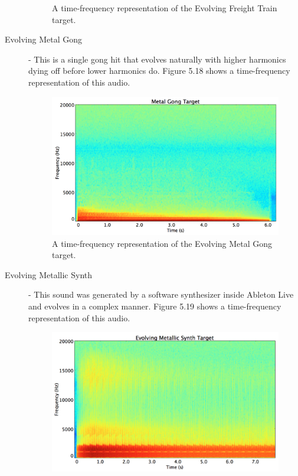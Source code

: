 \documentclass[a4paper,12pt]{report} 	%
\numberwithin{figure}{chapter}
\numberwithin{table}{chapter}
\numberwithin{equation}{chapter}
\begin{document}
\begin{flushleft}
\begin{description}
\begin{figure}[h!]
\begin{center}
\caption[Evolving Freight Train Time-Frequency Representation]{A time-frequency representation of the Evolving Freight Train target.}
\end{center}
\end{figure}
\item[Evolving Metal Gong] - This is a single gong hit that evolves naturally with higher harmonics dying off before lower harmonics do. Figure 5.18 shows a time-frequency representation of this audio.
\begin{figure}[h!]
\begin{center}
\includegraphics[scale=0.35,width=\linewidth]{MetalGongTargetSTFT}
\caption[Evolving Metal Gong Time-Frequency Representation]{A time-frequency representation of the Evolving Metal Gong target.}
\end{center}
\end{figure}
\item[Evolving Metallic Synth] - This sound was generated by a software synthesizer inside Ableton Live and evolves in a complex manner. Figure 5.19 shows a time-frequency representation of this audio.
\begin{figure}[h!]
\begin{center}
\includegraphics[scale=0.35,width=\linewidth]{EvolvingMetallicSynthTargetSTFT}

\end{center}
\end{figure}
\end{description}
\end{flushleft}
\end{document}
